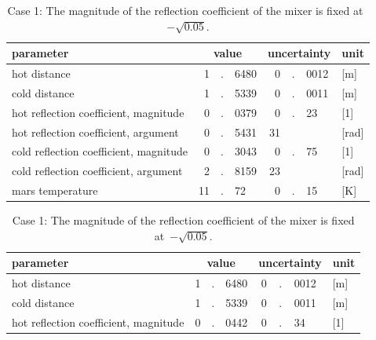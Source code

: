 \begin{table}
    \centering
    \begin{tabular}{l r@{}c@{}l r@{}c@{}l l}
        \toprule
        parameter &
        \multicolumn{3}{c}{value} &
        \multicolumn{3}{c}{uncertainty} & unit\\
        \midrule
            hot distance                                 &  1&.&6480  &  0&.&0012 & [\si{\meter}]  \\
            cold distance                                &  1&.&5339  &  0&.&0011 & [\si{\meter}]  \\
            hot reflection coefficient, magnitude        &  0&.&0379  &  0&.&23   & [1]            \\
            hot reflection coefficient, argument         &  0&.&5431  & 31& &     & [\si{\radian}] \\
            cold reflection coefficient, magnitude       &  0&.&3043  &  0&.&75   & [1]            \\
            cold reflection coefficient, argument        &  2&.&8159  & 23& &     & [\si{\radian}] \\
            mars temperature                             & 11&.&72    &  0&.&15   & [\si{\kelvin}] \\
        \bottomrule
    \end{tabular}
    \caption*{Case 1: The magnitude of the reflection coefficient of the mixer is fixed at~$-\sqrt{0.05}$.}
    \bigskip
    \begin{tabular}{l r@{}c@{}l r@{}c@{}l l}
        \toprule
        parameter &
        \multicolumn{3}{c}{value} &
        \multicolumn{3}{c}{uncertainty} & unit\\
        \midrule
            hot distance                                 &  1&.&6480 &  0&.&0012 & [\si{\meter}]  \\
            cold distance                                &  1&.&5339 &  0&.&0011 & [\si{\meter}]  \\
            hot reflection coefficient, magnitude        &  0&.&0442 &  0&.&34   & [1]            \\

\end{tabular}
\end{table}
